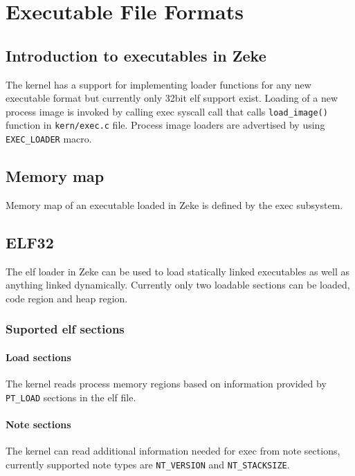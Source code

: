 \chapter{Executable File Formats}

\section{Introduction to executables in Zeke}

The kernel has a support for implementing loader functions for any new
executable format but currently only 32bit \acf{elf} support exist.
Loading of a new process image is invoked by calling exec syscall call that
calls \verb+load_image()+ function in \verb+kern/exec.c+ file.
Process image loaders are advertised by using \verb+EXEC_LOADER+ macro.

\section{Memory map}

Memory map of an executable loaded in Zeke is defined by the exec subsystem.


\section{ELF32}

The \acs{elf} loader in Zeke can be used to load statically linked executables
as well as anything linked dynamically. Currently only two loadable sections can
be loaded, code region and heap region.

\subsection{Suported \acs{elf} sections}
\subsubsection{Load sections}

The kernel reads process memory regions based on information provided by
\verb+PT_LOAD+ sections in the \acs{elf} file.

\subsubsection{Note sections}

The kernel can read additional information needed for exec from note sections,
currently supported note types are \verb+NT_VERSION+ and \verb+NT_STACKSIZE+.
